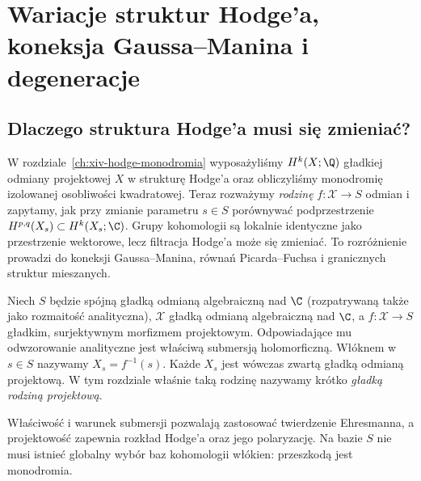 \chapter{Wariacje struktur Hodge'a, koneksja Gaussa--Manina i degeneracje}
\label{ch:xv-vhs-degeneracje}

\section{Dlaczego struktura Hodge'a musi się zmieniać?}
W rozdziale~\ref{ch:xiv-hodge-monodromia} wyposażyliśmy
$H^k(X;\Q)$ gładkiej odmiany projektowej $X$ w strukturę Hodge'a
oraz obliczyliśmy monodromię izolowanej osobliwości kwadratowej.
Teraz rozważymy \emph{rodzinę} $f:\mathcal X\to S$ odmian i zapytamy,
jak przy zmianie parametru $s\in S$ porównywać podprzestrzenie
$H^{p,q}(X_s)\subset H^k(X_s;\C)$.
Grupy kohomologii są lokalnie identyczne jako przestrzenie wektorowe,
lecz filtracja Hodge'a może się zmieniać. To rozróżnienie prowadzi
do koneksji Gaussa--Manina, równań Picarda--Fuchsa i granicznych
struktur mieszanych.

\begin{definicja}
Niech $S$ będzie spójną gładką odmianą algebraiczną nad $\C$
(rozpatrywaną także jako rozmaitość analityczna),
$\mathcal X$ gładką odmianą algebraiczną nad $\C$,
a $f:\mathcal X\to S$ gładkim, surjektywnym morfizmem
projektowym. Odpowiadające mu odwzorowanie analityczne
jest właściwą submersją holomorficzną. Włóknem w $s\in S$ nazywamy
$X_s=f^{-1}(s)$. Każde $X_s$ jest wówczas zwartą gładką
odmianą projektową. W tym rozdziale właśnie taką rodzinę
nazywamy krótko \emph{gładką rodziną projektową}.
\end{definicja}
\begin{uwaga}
Właściwość i warunek submersji pozwalają zastosować twierdzenie
Ehresmanna, a projektowość zapewnia rozkład Hodge'a oraz
jego polaryzację. Na bazie $S$ nie musi istnieć globalny wybór
baz kohomologii włókien: przeszkodą jest monodromia.
\end{uwaga}

